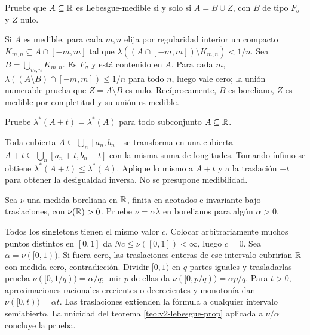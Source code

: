 \begin{ejercicio}\label{ej:v2-l06-4}
Pruebe que $A\subseteq\mathbb R$ es Lebesgue-medible si y solo si $A=B\cup Z$, con $B$ de tipo $F_\sigma$ y $Z$ nulo.
\end{ejercicio}
\begin{solucion}
Si $A$ es medible, para cada $m,n$ elija por regularidad interior un compacto $K_{m,n}\subseteq A\cap[-m,m]$ tal que $\lambda((A\cap[-m,m])\setminus K_{m,n})<1/n$. Sea $B=\bigcup_{m,n}K_{m,n}$. Es $F_\sigma$ y está contenido en $A$. Para cada $m$, $\lambda((A\setminus B)\cap[-m,m])\le1/n$ para todo $n$, luego vale cero; la unión numerable prueba que $Z=A\setminus B$ es nulo. Recíprocamente, $B$ es boreliano, $Z$ es medible por completitud y su unión es medible.
\end{solucion}

\begin{ejercicio}\label{ej:v2-l06-5}
Pruebe $\lambda^*(A+t)=\lambda^*(A)$ para todo subconjunto $A\subseteq\mathbb R$.
\end{ejercicio}
\begin{solucion}
Toda cubierta $A\subseteq\bigcup_n[a_n,b_n]$ se transforma en una cubierta $A+t\subseteq\bigcup_n[a_n+t,b_n+t]$ con la misma suma de longitudes. Tomando ínfimo se obtiene $\lambda^*(A+t)\le\lambda^*(A)$. Aplique lo mismo a $A+t$ y a la traslación $-t$ para obtener la desigualdad inversa. No se presupone medibilidad.
\end{solucion}

\begin{ejercicio}\label{ej:v2-l06-6}
Sea $\nu$ una medida boreliana en $\mathbb R$, finita en acotados e invariante bajo traslaciones, con $\nu(\mathbb R)>0$. Pruebe $\nu=\alpha\lambda$ en borelianos para algún $\alpha>0$.
\end{ejercicio}
\begin{solucion}
Todos los singletons tienen el mismo valor $c$. Colocar arbitrariamente muchos puntos distintos en $[0,1]$ da $Nc\le\nu([0,1])<\infty$, luego $c=0$. Sea $\alpha=\nu([0,1))$. Si fuera cero, las traslaciones enteras de ese intervalo cubrirían $\mathbb R$ con medida cero, contradicción. Dividir $[0,1)$ en $q$ partes iguales y trasladarlas prueba $\nu([0,1/q))=\alpha/q$; unir $p$ de ellas da $\nu([0,p/q))=\alpha p/q$. Para $t>0$, aproximaciones racionales crecientes o decrecientes y monotonía dan $\nu([0,t))=\alpha t$. Las traslaciones extienden la fórmula a cualquier intervalo semiabierto. La unicidad del teorema \ref{teo:v2-lebesgue-prop} aplicada a $\nu/\alpha$ concluye la prueba.
\end{solucion}

